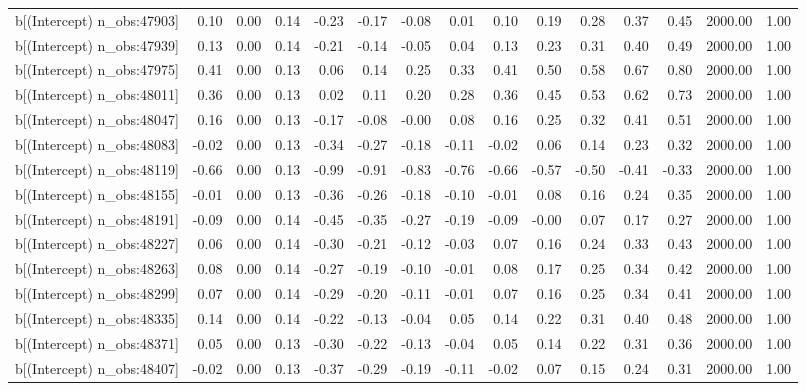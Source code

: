 \begin{table}[ht]
\begin{tabular}{rrrrrrrrrrrrrrr}
  b[(Intercept) n\_obs:47903] & 0.10 & 0.00 & 0.14 & -0.23 & -0.17 & -0.08 & 0.01 & 0.10 & 0.19 & 0.28 & 0.37 & 0.45 & 2000.00 & 1.00 \\ 
  b[(Intercept) n\_obs:47939] & 0.13 & 0.00 & 0.14 & -0.21 & -0.14 & -0.05 & 0.04 & 0.13 & 0.23 & 0.31 & 0.40 & 0.49 & 2000.00 & 1.00 \\ 
  b[(Intercept) n\_obs:47975] & 0.41 & 0.00 & 0.13 & 0.06 & 0.14 & 0.25 & 0.33 & 0.41 & 0.50 & 0.58 & 0.67 & 0.80 & 2000.00 & 1.00 \\ 
  b[(Intercept) n\_obs:48011] & 0.36 & 0.00 & 0.13 & 0.02 & 0.11 & 0.20 & 0.28 & 0.36 & 0.45 & 0.53 & 0.62 & 0.73 & 2000.00 & 1.00 \\ 
  b[(Intercept) n\_obs:48047] & 0.16 & 0.00 & 0.13 & -0.17 & -0.08 & -0.00 & 0.08 & 0.16 & 0.25 & 0.32 & 0.41 & 0.51 & 2000.00 & 1.00 \\ 
  b[(Intercept) n\_obs:48083] & -0.02 & 0.00 & 0.13 & -0.34 & -0.27 & -0.18 & -0.11 & -0.02 & 0.06 & 0.14 & 0.23 & 0.32 & 2000.00 & 1.00 \\ 
  b[(Intercept) n\_obs:48119] & -0.66 & 0.00 & 0.13 & -0.99 & -0.91 & -0.83 & -0.76 & -0.66 & -0.57 & -0.50 & -0.41 & -0.33 & 2000.00 & 1.00 \\ 
  b[(Intercept) n\_obs:48155] & -0.01 & 0.00 & 0.13 & -0.36 & -0.26 & -0.18 & -0.10 & -0.01 & 0.08 & 0.16 & 0.24 & 0.35 & 2000.00 & 1.00 \\ 
  b[(Intercept) n\_obs:48191] & -0.09 & 0.00 & 0.14 & -0.45 & -0.35 & -0.27 & -0.19 & -0.09 & -0.00 & 0.07 & 0.17 & 0.27 & 2000.00 & 1.00 \\ 
  b[(Intercept) n\_obs:48227] & 0.06 & 0.00 & 0.14 & -0.30 & -0.21 & -0.12 & -0.03 & 0.07 & 0.16 & 0.24 & 0.33 & 0.43 & 2000.00 & 1.00 \\ 
  b[(Intercept) n\_obs:48263] & 0.08 & 0.00 & 0.14 & -0.27 & -0.19 & -0.10 & -0.01 & 0.08 & 0.17 & 0.25 & 0.34 & 0.42 & 2000.00 & 1.00 \\ 
  b[(Intercept) n\_obs:48299] & 0.07 & 0.00 & 0.14 & -0.29 & -0.20 & -0.11 & -0.01 & 0.07 & 0.16 & 0.25 & 0.34 & 0.41 & 2000.00 & 1.00 \\ 
  b[(Intercept) n\_obs:48335] & 0.14 & 0.00 & 0.14 & -0.22 & -0.13 & -0.04 & 0.05 & 0.14 & 0.22 & 0.31 & 0.40 & 0.48 & 2000.00 & 1.00 \\ 
  b[(Intercept) n\_obs:48371] & 0.05 & 0.00 & 0.13 & -0.30 & -0.22 & -0.13 & -0.04 & 0.05 & 0.14 & 0.22 & 0.31 & 0.36 & 2000.00 & 1.00 \\ 
  b[(Intercept) n\_obs:48407] & -0.02 & 0.00 & 0.13 & -0.37 & -0.29 & -0.19 & -0.11 & -0.02 & 0.07 & 0.15 & 0.24 & 0.31 & 2000.00 & 1.00 \\ 

\end{tabular}
\end{table}
